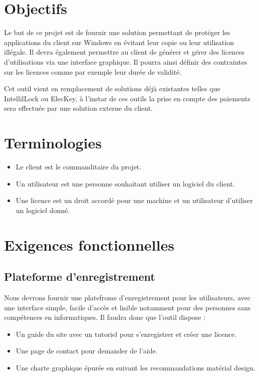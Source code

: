 \chapter{Objectifs}

Le but de ce projet est de fournir une solution permettant de protéger les applications
du client sur Windows en évitant leur copie ou leur utilisation illégale. 
Il devra également permettre au client de générer et gérer des licences d'utilisations 
via une interface graphique. Il pourra ainsi définir des contraintes sur les licences 
comme par exemple leur durée de validité. \newline

Cet outil vient en remplacement de solutions déjà existantes telles que IntellilLock ou ElecKey,
à l'instar de ces outils la prise en compte des paiements sera effectuée par une solution externe
du client.

\chapter{Terminologies}

\begin{itemize}
	\item Le client est le commanditaire du projet.
	\item Un utilisateur est une personne souhaitant utiliser un logiciel du client. 
	\item Une licence est un droit accordé pour une machine et un utilisateur d'utiliser un logiciel donné.
\end{itemize}

\chapter{Exigences fonctionnelles}

\section{Plateforme d'enregistrement}
Nous devrons fournir une platefrome d'enregistrement pour les utilisateurs, avec une interface simple, facile d'accès et lisible notamment pour des personnes sans compétences en informatiques. Il faudra donc que l'outil dispose :
\begin{itemize}
	\item Un guide du site avec un tutoriel pour s'enregistrer et créer une licence.
	\item Une page de contact pour demander de l'aide.
	\item Une charte graphique épurée en suivant les recommandations matérial design.
\end{itemize}

